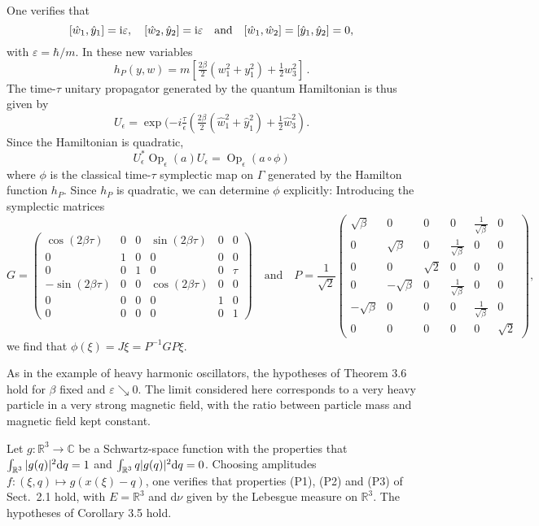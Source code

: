 \documentclass[12pt]{article}
\renewcommand{\d}{{\rm d}}
\renewcommand{\i}{{\rm i}}
\begin{document}
One verifies that
$$[\hat w_1,\hat y_1]=\i\varepsilon,\quad [\hat w_2,\hat y_2]=\i \varepsilon\quad \mbox{and}\quad [\hat w_1,\hat w_2]=[\hat y_1,\hat y_2]=0,$$
with $\varepsilon=\hbar/m$. In these new variables
$$h_P(y,w)=m[\tfrac{2\beta} 2(w_1^2+y_1^2)+\tfrac12w_3^2]\,.$$
The time-$\tau$ unitary propagator generated by the quantum Hamiltonian is thus given by
$$U_\epsilon=\exp(-i \tfrac{\tau}{\epsilon}(\tfrac{2\beta} 2(\hat w_1^2+\hat y_1^2)+\tfrac12\hat w_3^2).$$
Since the Hamiltonian is quadratic, 
$$U_\epsilon^*\operatorname{Op}_{\epsilon}(a)U_\epsilon=\operatorname{Op}_\epsilon(a\circ\phi)$$
where $\phi$ is the classical time-$\tau$ symplectic map on $\Gamma$ generated by the Hamilton function $h_P$. 
Since $h_P$ is quadratic, we can determine $\phi$ explicitly: Introducing the symplectic matrices
$$G=\begin{pmatrix}
	\cos(2\beta\tau)&0&0&\sin(2\beta\tau) & 0&0\\
	0&1&0&0&0&0\\
	0&0&1&0&0&\tau\\
	-\sin(2\beta\tau) &0&0& \cos(2\beta\tau)& 0 &0\\
	0&0&0&0&1&0\\
	0&0&0&0&0&1
\end{pmatrix}\quad\mbox{and}\quad P=\frac1{\sqrt{2}}\begin{pmatrix}
\sqrt{\beta}&0&0&0&\frac1{\sqrt{\beta}}&0\\
0&\sqrt{\beta}&0&\frac{1}{\sqrt{\beta}}&0&0\\
0&0&\sqrt{2}&0&0&0\\
0&-\sqrt{\beta}&0&\frac{1}{\sqrt{\beta}}&0&0\\
-\sqrt{\beta}&0&0&0&\frac1{\sqrt{\beta}}&0\\
0&0&0&0&0&\sqrt{2}
\end{pmatrix},$$
we find that $\phi(\xi)=J\xi= P^{-1}GP\xi$.

As in the example of heavy harmonic oscillators, the hypotheses of Theorem 3.6 hold for $\beta$ fixed and 
$\varepsilon\searrow 0$. The limit considered here corresponds to a very heavy particle in a very strong 
magnetic field, with the ratio between particle mass and magnetic field kept constant.

Let $g:\mathbb R^3\to\mathbb C$ be a Schwartz-space function with the properties that $\int_{\mathbb R^3}|g(q)|^2\d q=1$ 
and $\int_{\mathbb R^3}q |g(q)|^2\d q=0$. Choosing amplitudes $f:(\xi,q)\mapsto g(x(\xi)-q)$, one verifies that properties
 (P1), (P2) and (P3) of Sect.~2.1 hold, with $E=\mathbb R^3$ and $\text{d}\nu$ given by the Lebesgue measure on 
 $\mathbb R^3$. The hypotheses of Corollary 3.5 hold.
\end{document}
